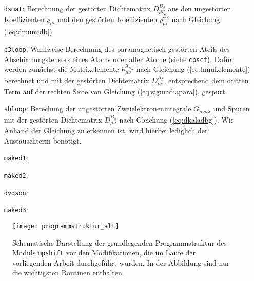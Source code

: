 \begin{itemize}[leftmargin=60pt]
\item[\texttt{dsmat}:] Berechnung der gestörten Dichtematrix $D_{\mu\nu}^{B_\beta}$ aus den ungestörten Koeffizienten $c_{\mu i}$ und den gestörten Koeffizienten $c_{\mu i}^{B_\beta}$ nach Gleichung (\ref{eq:dmunudb}).
\item[\texttt{p3loop}:] Wahlweise Berechnung des paramagnetisch gestörten Ateils des Abschirmungstensors eines Atoms oder aller Atome (siehe \texttt{cpscf}). Dafür werden zunächst die Matrixelemente $h_{\mu\nu}^{\mu_{K_\alpha}}$ nach Gleichung (\ref{eq:hmukelemente}) berechnet und mit der gestörten Dichtematrix $D_{\mu\nu}^{B_\beta}$, entsprechend dem dritten Term auf der rechten Seite von Gleichung (\ref{eq:sigmadiapara}), gespurt.
\item[\texttt{shloop}:] Berechung der ungestörten Zweielektronenintegrale $G_{\mu\nu\kappa\lambda}$ und Spuren mit der gestörten Dichtematrix $D_{\mu\nu}^{B_\beta}$ nach Gleichung (\ref{eq:dkaladbg}). Wie Anhand der Gleichung zu erkennen ist, wird hierbei lediglich der Austauschterm benötigt.
\item[\texttt{maked1}:]
\item[\texttt{maked2}:]
\item[\texttt{dvdson}:]
\item[\texttt{maked3}:]
\end{itemize}

\newpage
\begin{figure}[ht!]
\centering
\texttt{[image: programmstruktur\_alt]}
\captionsetup{figurewithin = chapter}
\captionsetup{font=small, labelfont=bf}\caption[Grundlegende Programmstruktur]{Schematische Darstellung der grundlegenden Programmstruktur des Moduls \texttt{mpshift} vor den Modifikationen, die im Laufe der vorliegenden Arbeit durchgeführt wurden. In der Abbildung sind nur die wichtigsten Routinen enthalten.}
\label{abb:programmstrukur_alt}
\end{figure}
